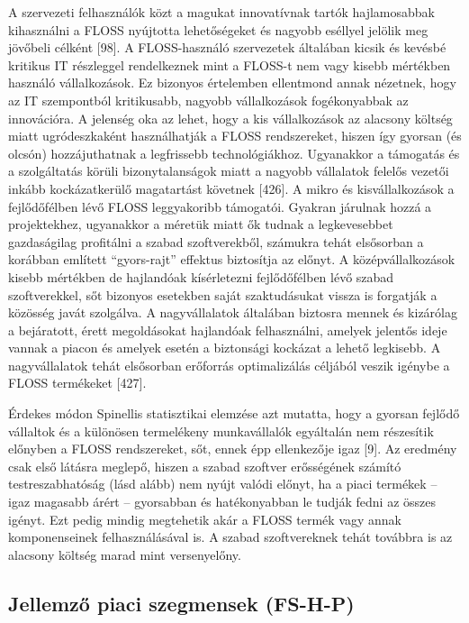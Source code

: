 \documentclass[12pt,magyar,a4paper,oneside]{scrreprt}
\begin{document}
A szervezeti felhasználók közt a magukat innovatívnak tartók
hajlamosabbak kihasználni a FLOSS nyújtotta lehetőségeket és nagyobb
eséllyel jelölik meg jövőbeli célként {[}98{]}. A FLOSS-használó
szervezetek általában kicsik és kevésbé kritikus IT részleggel
rendelkeznek mint a FLOSS-t nem vagy kisebb mértékben használó
vállalkozások. Ez bizonyos értelemben ellentmond annak nézetnek, hogy az
IT szempontból kritikusabb, nagyobb vállalkozások fogékonyabbak az
innovációra. A jelenség oka az lehet, hogy a kis vállalkozások az
alacsony költség miatt ugródeszkaként használhatják a FLOSS
rendszereket, hiszen így gyorsan (és olcsón) hozzájuthatnak a
legfrissebb technológiákhoz. Ugyanakkor a támogatás és a szolgáltatás
körüli bizonytalanságok miatt a nagyobb vállalatok felelős vezetői
inkább kockázatkerülő magatartást követnek {[}426{]}. A mikro és
kisvállalkozások a fejlődőfélben lévő FLOSS leggyakoribb támogatói.
Gyakran járulnak hozzá a projektekhez, ugyanakkor a méretük miatt ők
tudnak a legkevesebbet gazdaságilag profitálni a szabad szoftverekből,
számukra tehát elsősorban a korábban említett ``gyors-rajt'' effektus
biztosítja az előnyt. A középvállalkozások kisebb mértékben de
hajlandóak kísérletezni fejlődőfélben lévő szabad szoftverekkel, sőt
bizonyos esetekben saját szaktudásukat vissza is forgatják a közösség
javát szolgálva. A nagyvállalatok általában biztosra mennek és kizárólag
a bejáratott, érett megoldásokat hajlandóak felhasználni, amelyek
jelentős ideje vannak a piacon és amelyek esetén a biztonsági kockázat a
lehető legkisebb. A nagyvállalatok tehát elsősorban erőforrás
optimalizálás céljából veszik igénybe a FLOSS termékeket {[}427{]}.

Érdekes módon Spinellis statisztikai elemzése azt mutatta, hogy a
gyorsan fejlődő vállaltok és a különösen termelékeny munkavállalók
egyáltalán nem részesítik előnyben a FLOSS rendszereket, sőt, ennek épp
ellenkezője igaz {[}9{]}. Az eredmény csak első látásra meglepő, hiszen
a szabad szoftver erősségének számító testreszabhatóság (lásd alább) nem
nyújt valódi előnyt, ha a piaci termékek -- igaz magasabb árért --
gyorsabban és hatékonyabban le tudják fedni az összes igényt. Ezt pedig
mindig megtehetik akár a FLOSS termék vagy annak komponenseinek
felhasználásával is. A szabad szoftvereknek tehát továbbra is az
alacsony költség marad mint versenyelőny.

\hypertarget{sec:FS-H-P}{%
\subsection{Jellemző piaci szegmensek (FS-H-P)}\label{sec:FS-H-P}}
\end{document}

